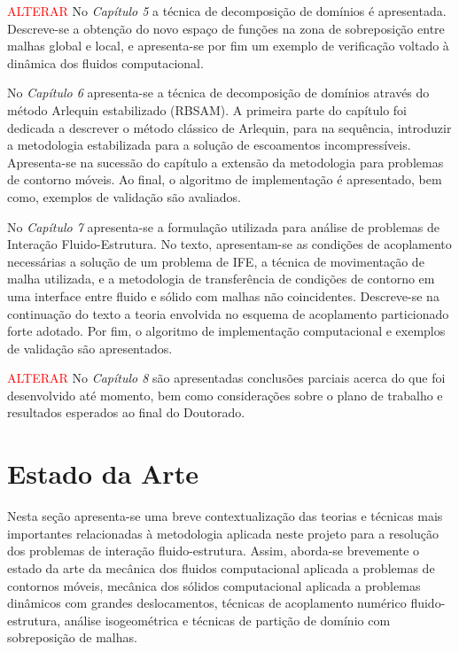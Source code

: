 \documentclass[tese_patricia.tex]{subfiles}
\begin{document}
\textcolor{red}{ALTERAR}
No \textit{Capítulo 5} a técnica de decomposição de domínios é apresentada. Descreve-se a obtenção do novo espaço de funções na zona de sobreposição entre malhas global e local, e apresenta-se por fim um exemplo de verificação voltado à dinâmica dos fluidos computacional.

No \textit{Capítulo 6} apresenta-se a técnica de decomposição de domínios através do método Arlequin estabilizado (RBSAM). A primeira parte do capítulo foi dedicada a descrever o método clássico de Arlequin, para na sequência, introduzir a metodologia estabilizada para a solução de escoamentos incompressíveis. Apresenta-se na sucessão do capítulo a extensão da metodologia para problemas de contorno móveis. Ao final, o algoritmo de implementação é apresentado, bem como, exemplos de validação são avaliados.

No \textit{Capítulo 7} apresenta-se a formulação utilizada para análise de problemas de Interação Fluido-Estrutura. No texto, apresentam-se as condições de acoplamento necessárias a solução de um problema de IFE, a técnica de movimentação de malha utilizada, e a metodologia de transferência de condições de contorno em uma interface entre fluido e sólido com malhas não coincidentes. Descreve-se na continuação do texto a teoria envolvida no esquema de acoplamento particionado forte adotado. Por fim, o algoritmo de implementação computacional e exemplos de validação são apresentados.

\textcolor{red}{ALTERAR} No \textit{Capítulo 8} são apresentadas conclusões parciais acerca do que foi desenvolvido até momento, bem como considerações sobre o plano de trabalho e resultados esperados ao final do Doutorado.


\section[Estado da Arte]{Estado da Arte}\label{section:estado_da_arte}

Nesta seção apresenta-se uma breve contextualização das teorias e técnicas mais importantes relacionadas à metodologia aplicada neste projeto para a resolução dos problemas de interação fluido-estrutura. Assim, aborda-se brevemente o estado da arte da mecânica dos fluidos computacional aplicada a problemas de contornos móveis, mecânica dos sólidos computacional aplicada a problemas dinâmicos com grandes deslocamentos, técnicas de acoplamento numérico fluido-estrutura, análise isogeométrica e técnicas de partição de domínio com sobreposição de malhas.
\end{document}
